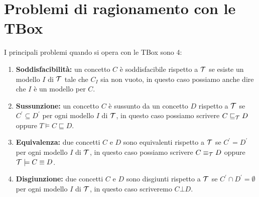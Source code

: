 \documentclass[../main.tex]{subfiles}
\begin{document}
   \section{Problemi di ragionamento con le TBox}
   I principali problemi quando si opera con le TBox sono 4:
   \begin{enumerate}
      \item \textbf{Soddisfacibilità:} un concetto $C$ è soddisfacibile rispetto a $\mathcal{T}$ se esiste un modello $I$ di $\mathcal{T}$ tale che $C_I$ sia non vuoto, in questo caso possiamo anche dire che $I$ è un modello per $C$.
      \item \textbf{Sussunzione:} un concetto $C$ è sussunto da un concetto $D$ rispetto a $\mathcal{T}$ se $C^\prime \subseteq D^\prime$ per ogni modello $I$ di $\mathcal{T}$, in questo caso possiamo scrivere $C \sqsubseteq_{\mathcal{T}} D$ oppure $T \models C \sqsubseteq D$.
      \item \textbf{Equivalenza:} due concetti $C$ e $D$ sono equivalenti rispetto a $\mathcal{T}$ se $C^\prime = D^\prime$ per ogni modello $I$ di $\mathcal{T}$, in questo caso possiamo scrivere $C \equiv_{\mathcal{T}} D$ oppure $\mathcal{T} \models C \equiv D$.
      \item \textbf{Disgiunzione:} due concetti $C$ e $D$ sono disgiunti rispetto a $\mathcal{T}$ se $C^\prime \cap D^\prime = \emptyset$ per ogni modello $I$ di $\mathcal{T}$, in questo caso scriveremo $C \bot D$.
   \end{enumerate}
\end{document}

